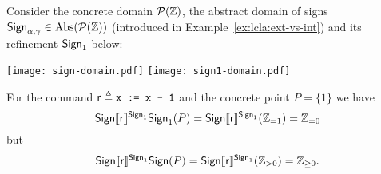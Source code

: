 \begin{example}\label{ex:lcla:bound-A'-not-A}
	Consider the concrete domain $\mathcal{P}(\mathbb{Z})$, the abstract domain of signs $\mathsf{Sign}_{\alpha, \gamma} \in \text{\normalfont Abs}(\mathcal{P}(\mathbb{Z}))$ (introduced in Example~\ref{ex:lcla:ext-vs-int}) and its refinement $\mathsf{Sign}_{1}$ below:

	\begin{center}
%			
%			
		\texttt{[image: sign-domain.pdf]}
		\qquad\qquad
%			
%			
		\texttt{[image: sign1-domain.pdf]}
	\end{center}

	For the command $\mathsf{r} \triangleq \texttt{x := x - 1}$ and the concrete point $P = \{ 1 \}$ we have
	\[
	\mathsf{Sign} \llbracket\mathsf{r}\rrbracket^{\mathsf{Sign}_{1}} \mathsf{Sign}_1(P) = \mathsf{Sign} \llbracket\mathsf{r}\rrbracket^{\mathsf{Sign}_{1}} (\mathbb{Z}_{= 1}) = \mathbb{Z}_{= 0}
	\]
	but
	\[
	\mathsf{Sign} \llbracket\mathsf{r}\rrbracket^{\mathsf{Sign}_1} \mathsf{Sign}(P) = \mathsf{Sign} \llbracket\mathsf{r}\rrbracket^{\mathsf{Sign}_1} (\mathbb{Z}_{> 0}) = \mathbb{Z}_{\ge 0} .
	\]
\end{example}

